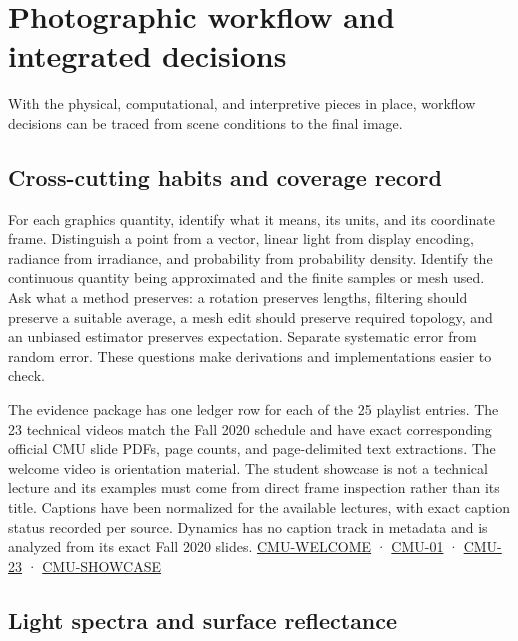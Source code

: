 \section{Photographic workflow and integrated decisions}\label{04-visual-computing-ii-ch034-photographic-workflow-and-integrated-decisions}

With the physical, computational, and interpretive pieces in place, workflow decisions can be traced from scene conditions to the final image.

\subsection{Cross-cutting habits and coverage record}\label{04-visual-computing-ii-ch034-cross-cutting-habits-and-coverage-record}

For each graphics quantity, identify what it means, its units, and its coordinate frame. Distinguish a point from a vector, linear light from display encoding, radiance from irradiance, and probability from probability density. Identify the continuous quantity being approximated and the finite samples or mesh used. Ask what a method preserves: a rotation preserves lengths, filtering should preserve a suitable average, a mesh edit should preserve required topology, and an unbiased estimator preserves expectation. Separate systematic error from random error. These questions make derivations and implementations easier to check.

The evidence package has one ledger row for each of the 25 playlist entries. The 23 technical videos match the Fall 2020 schedule and have exact corresponding official CMU slide PDFs, page counts, and page-delimited text extractions. The welcome video is orientation material. The student showcase is not a technical lecture and its examples must come from direct frame inspection rather than its title. Captions have been normalized for the available lectures, with exact caption status recorded per source. Dynamics has no caption track in metadata and is analyzed from its exact Fall 2020 slides. \hyperref[04-visual-computing-ii-ch036-cmu-welcome---course-welcome-and-learning-workflow]{CMU-WELCOME} · \hyperref[04-visual-computing-ii-ch036-cmu-01---course-overview]{CMU-01} · \hyperref[04-visual-computing-ii-ch036-cmu-23---physically-based-animation-and-pdes]{CMU-23} · \hyperref[04-visual-computing-ii-ch036-cmu-showcase---student-creations-and-project-outcomes]{CMU-SHOWCASE}

\subsection{Light spectra and surface reflectance}\label{04-visual-computing-ii-ch034-light-spectra-and-surface-reflectance}

